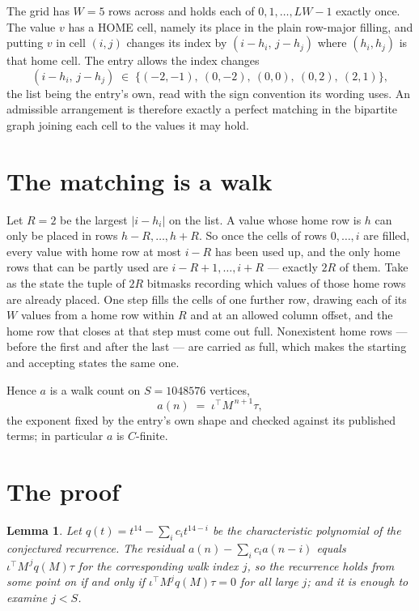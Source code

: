 \documentclass[11pt,a4paper]{article}
\theoremstyle{plain}
\newtheorem{lemma}[theorem]{Lemma}
\theoremstyle{definition}
\begin{document}
The grid has $W=5$ rows across and holds each of $0,1,\dots,LW-1$ exactly once. The value
$v$ has a HOME cell, namely its place in the plain row-major filling, and putting $v$ in cell
$(i,j)$ changes its index by $(i-h_i,\,j-h_j)$ where $(h_i,h_j)$ is that home cell. The entry
allows the index changes
\[
(i-h_i,\,j-h_j)\;\in\;\{(-2,-1),\ (0,-2),\ (0,0),\ (0,2),\ (2,1)\},
\]
the list being the entry's own, read with the sign convention its wording uses. An admissible
arrangement is therefore exactly a perfect matching in the bipartite graph joining each cell to
the values it may hold.

\section{The matching is a walk}

Let $R=2$ be the largest $|i-h_i|$ on the list. A value whose home row is $h$ can only be
placed in rows $h-R,\dots,h+R$. So once the cells of rows $0,\dots,i$ are filled, every
value with home row at most $i-R$ has been used up, and the only home rows that can be
partly used are $i-R+1,\dots,i+R$ --- exactly $2R$ of them. Take as the state the tuple of
$2R$ bitmasks recording which values of those home rows are already placed. One step fills
the cells of one further row, drawing each of its $W$ values from a home row within $R$
and at an allowed column offset, and the home row that closes at that step must come out
full. Nonexistent home rows --- before the first and after the last --- are carried as
full, which makes the starting and accepting states the same one.

Hence $a$ is a walk count on $S=1048576$ vertices,
\[
a(n)\;=\;\iota^{\!\top}M^{\,n+1}\tau ,
\]
the exponent fixed by the entry's own shape and checked against its published terms; in
particular $a$ is $C$-finite.

\section{The proof}

\begin{lemma}\label{lem:crit}
Let $q(t)=t^{14}-\sum_i c_it^{14-i}$ be the characteristic polynomial of the
conjectured recurrence. The residual $a(n)-\sum_ic_ia(n-i)$ equals
$\iota^{\!\top}M^{\,j}q(M)\tau$ for the corresponding walk index $j$, so the recurrence
holds from some point on if and only if $\iota^{\!\top}M^{j}q(M)\tau=0$ for all large $j$;
and it is enough to examine $j<S$.
\end{lemma}
\end{document}

